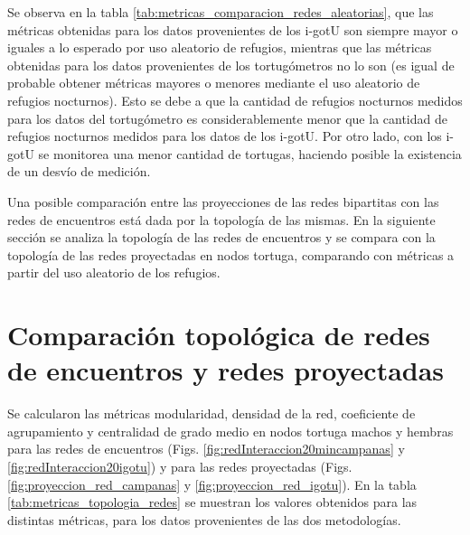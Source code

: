 Se observa en la tabla \ref{tab:metricas_comparacion_redes_aleatorias}, que las métricas obtenidas para los datos provenientes de los i-gotU son siempre mayor o iguales a lo esperado por uso aleatorio de refugios, mientras que las métricas obtenidas para los datos provenientes de los tortugómetros no lo son (es igual de probable obtener métricas mayores o menores mediante el uso aleatorio de refugios nocturnos). Esto se debe a que la cantidad de refugios nocturnos medidos para los datos del tortugómetro es considerablemente menor que la cantidad de refugios nocturnos medidos para los datos de los i-gotU. Por otro lado, con los i-gotU se monitorea una menor cantidad de tortugas, haciendo posible la existencia de un desvío de medición.
 
Una posible comparación entre las proyecciones de las redes bipartitas con las redes de encuentros está dada por la topología de las mismas.  En la siguiente sección se analiza la topología de las redes de encuentros y se compara con la topología de las redes proyectadas en nodos tortuga, comparando con métricas a partir del uso aleatorio de los refugios.
\section{Comparación topológica de redes de encuentros y redes proyectadas}
Se calcularon las métricas modularidad, densidad de la red, coeficiente de agrupamiento y centralidad de grado medio en nodos tortuga machos y hembras para las redes de encuentros (Figs. \ref{fig:redInteraccion20mincampanas} y \ref{fig:redInteraccion20igotu}) y para las redes proyectadas (Figs. \ref{fig:proyeccion_red_campanas} y \ref{fig:proyeccion_red_igotu}). En la tabla \ref{tab:metricas_topologia_redes}   se muestran los valores obtenidos para las distintas métricas, para los datos provenientes de las dos metodologías.
 
 
 
